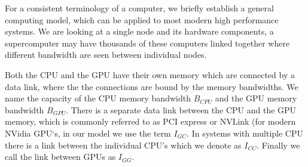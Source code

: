 \documentclass[]{article}
\begin{document}
For a consistent terminology of a computer, we briefly establish a general computing model, which can be applied to most modern high performance systems. We are looking at a single node and its hardware components, a supercomputer may have thousands of these computers linked together where different bandwidth are seen between individual nodes.

Both the CPU and the GPU have their own memory which are connected by a data link, where the the connections are bound by the memory bandwidths. We name the capacity of the CPU memory bandwidth $B_{CPU}$ and the GPU memory bandwidth $B_{GPU}$. There is a separate data link between the CPU and the GPU memory, which is commonly referred to as PCI express or NVLink (for modern NVidia GPU`s, in our model we use the term $I_{GC}$. In systems with multiple CPU there is a link between the individual CPU's which we denote as $I_{CC}$. Finally we call the link between GPUs as $I_{GG}$.
\end{document}
